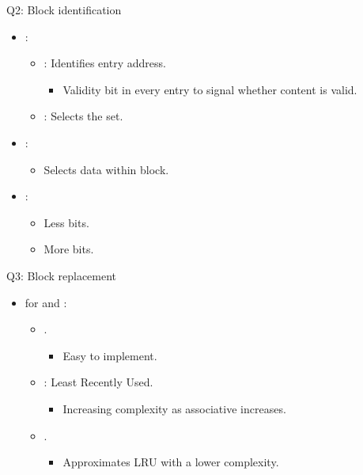 \begin{frame}[t]{Q2: Block identification}
\begin{itemize}
  \item {}:
    \begin{itemize}
      \item {}: Identifies entry address.
        \begin{itemize}
          \item Validity bit in every entry to signal whether content is valid.
        \end{itemize}
      \item {}: Selects the set.
    \end{itemize}

  \item {}:
    \begin{itemize}
      \item Selects data within block.
    \end{itemize}

  \item {}:
    \begin{itemize}
      \item Less  bits.
      \item More  bits.
    \end{itemize}
\end{itemize}
\end{frame}

\begin{frame}[t]{Q3: Block replacement}
\begin{itemize}
  \item {} for  and 
        :
    \begin{itemize}
      \item {}.
        \begin{itemize}
          \item Easy to implement.
        \end{itemize}
      \item {}: Least Recently Used.
        \begin{itemize}
          \item Increasing complexity as associative increases.
        \end{itemize}
      \item {}.
        \begin{itemize}
          \item Approximates LRU with a lower complexity.
        \end{itemize}
    \end{itemize}
\end{itemize}
\end{frame}

